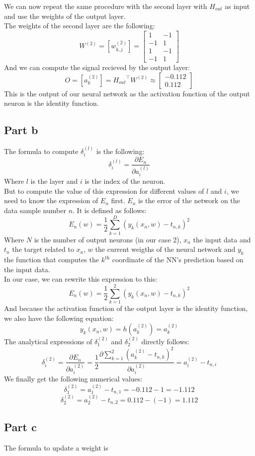 \documentclass[a4paper, 10pt]{article}
\begin{document}
We can now repeat the same procedure with the second layer with $H_{out}$ as input and 
use the weights of the output layer.
\\
The weights of the second layer are the following:
$$
W^{(2)} = [w_{k,j}^{(2)}] = \begin{bmatrix}
    1 & -1\\
    -1 & 1\\
    1 & -1\\
    -1 & 1
\end{bmatrix}
$$
And we can compute the signal recieved by the output layer:
$$
O = [a_k^{(2)}] = {H_{out}}^\top W^{(2)} \approx \begin{bmatrix}
    -0.112\\
    0.112
\end{bmatrix}
$$
This is the output of our neural network as the activation
fonction of the output neuron is the identity function.

\subsection{Part b}
The formula to compute $\delta_i^{(l)}$ is the following:
$$
\delta_i^{(l)} = \frac{\partial E_n}{\partial a_i^{(l)}}
$$
Where $l$ is the layer and $i$ is the index of the neuron.
\\
But to compute the value of this expression for different values of $l$ and $i$,
we need to know the expression of $E_n$ first. $E_n$ is the error of the network
on the data sample number $n$. It is defined as follows:
$$
E_n(w) = \frac{1}{2} \sum_{k=1}^D ( y_k(x_n,w)-t_{n,k})^2
$$
Where $N$ is the number of output neurons (in our case 2), $x_n$ the input data and 
$t_n$ the target related to $x_n$, $w$ the current weigths of the neural network and 
$y_k$ the function that computes the $k^\text{th}$ coordinate of the NN's prediction based on the input data.
\\
In our case, we can rewrite this expression to this:
$$
E_n(w) = \frac{1}{2} \sum_{k=1}^2( y_k(x_n, w)-t_{n,k})^2
$$
And because the activation function of the output layer is the identity function,
we also have the following equation:
$$
y_k(x_n,w) = h(a_k^{(2)}) = a_k^{(2)}
$$
The analytical expressions of $\delta_1^{(2)}$ and $\delta_2^{(2)}$ directly follows:
$$
\delta_i^{(2)} = \frac{\partial E_n}{\partial a_i^{(2)}} = \frac{1}{2}\frac{\partial  \sum_{k=1}^2( a_k^{(2)}-t_{n,k})^2}{\partial a_i^{(2)}} = a_i^{(2)} - t_{n,i}
$$
We finally get the following numerical values:
$$
\delta_1^{(2)} = a_1^{(2)} - t_{n,1} = -0.112 - 1 = -1.112
$$
$$
\delta_2^{(2)} = a_2^{(2)} - t_{n,2} = 0.112 - (-1) = 1.112
$$

\subsection{Part c}
The formula to update a weight is 
\end{document}
